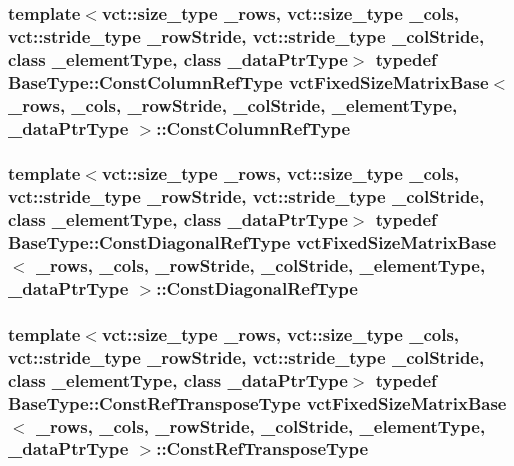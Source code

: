 \hypertarget{classvct_fixed_size_matrix_base_a5ef3c78aaccbfe9c5e4843bffa2770b5}{
\subsubsection[{Const\-Column\-Ref\-Type}]{\setlength{\rightskip}{0pt plus 5cm}template$<$vct\-::size\-\_\-type \-\_\-rows, vct\-::size\-\_\-type \-\_\-cols, vct\-::stride\-\_\-type \-\_\-row\-Stride, vct\-::stride\-\_\-type \-\_\-col\-Stride, class \-\_\-element\-Type, class \-\_\-data\-Ptr\-Type$>$ typedef {\bf Base\-Type\-::\-Const\-Column\-Ref\-Type} {\bf vct\-Fixed\-Size\-Matrix\-Base}$<$ \-\_\-rows, \-\_\-cols, \-\_\-row\-Stride, \-\_\-col\-Stride, \-\_\-element\-Type, \-\_\-data\-Ptr\-Type $>$\-::{\bf Const\-Column\-Ref\-Type}}}\label{classvct_fixed_size_matrix_base_a5ef3c78aaccbfe9c5e4843bffa2770b5}
\hypertarget{classvct_fixed_size_matrix_base_a34c960d927329c09d97b6b69196c2cbe}{
\subsubsection[{Const\-Diagonal\-Ref\-Type}]{\setlength{\rightskip}{0pt plus 5cm}template$<$vct\-::size\-\_\-type \-\_\-rows, vct\-::size\-\_\-type \-\_\-cols, vct\-::stride\-\_\-type \-\_\-row\-Stride, vct\-::stride\-\_\-type \-\_\-col\-Stride, class \-\_\-element\-Type, class \-\_\-data\-Ptr\-Type$>$ typedef {\bf Base\-Type\-::\-Const\-Diagonal\-Ref\-Type} {\bf vct\-Fixed\-Size\-Matrix\-Base}$<$ \-\_\-rows, \-\_\-cols, \-\_\-row\-Stride, \-\_\-col\-Stride, \-\_\-element\-Type, \-\_\-data\-Ptr\-Type $>$\-::{\bf Const\-Diagonal\-Ref\-Type}}}\label{classvct_fixed_size_matrix_base_a34c960d927329c09d97b6b69196c2cbe}
\hypertarget{classvct_fixed_size_matrix_base_abea4d6acc16784903d485542c24d8446}{
\subsubsection[{Const\-Ref\-Transpose\-Type}]{\setlength{\rightskip}{0pt plus 5cm}template$<$vct\-::size\-\_\-type \-\_\-rows, vct\-::size\-\_\-type \-\_\-cols, vct\-::stride\-\_\-type \-\_\-row\-Stride, vct\-::stride\-\_\-type \-\_\-col\-Stride, class \-\_\-element\-Type, class \-\_\-data\-Ptr\-Type$>$ typedef {\bf Base\-Type\-::\-Const\-Ref\-Transpose\-Type} {\bf vct\-Fixed\-Size\-Matrix\-Base}$<$ \-\_\-rows, \-\_\-cols, \-\_\-row\-Stride, \-\_\-col\-Stride, \-\_\-element\-Type, \-\_\-data\-Ptr\-Type $>$\-::{\bf Const\-Ref\-Transpose\-Type}}}\label{classvct_fixed_size_matrix_base_abea4d6acc16784903d485542c24d8446}
